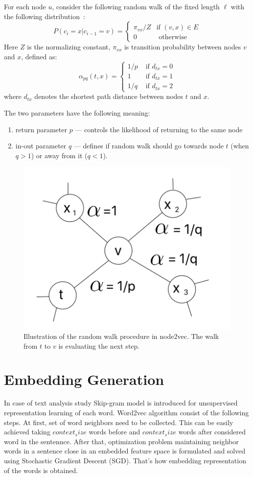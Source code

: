 For each node $u$, consider the following random walk of the fixed length $\ell$ with the following distribution~\cite{DBLP:journals/corr/abs-1011-4071}:
\begin{equation*}
P(c_i = x|c_{i-1} = v) =
 \begin{cases}
   \pi_{vx}/Z &\text{if $(v,x)\in E$}\\
   0 &\text{ otherwise}
 \end{cases}
\end{equation*}
Here $Z$ is the normalizing constant, $\pi_{vx}$ is transition probability between nodes $v$ and $x$, defined as: 
\[ 
  \alpha _{pq}(t, x) = \begin{cases}
   1/p &\text{ if $d_{tx} = 0$}\\
   1   &\text{ if $d_{tx} = 1$}\\
   1/q &\text{ if $d_{tx} = 2$}
   \end{cases}
\]
where $d_{tx}$ denotes the shortest path distance between nodes $t$ and $x$.


The two parameters have the following meaning:

\begin{enumerate}
    \item return parameter $p$ --- controls the likelihood of returning to the same node
    \item in-out parameter $q$ --- defines if random walk should go towards node $t$ (when $q > 1$) or away from it ($q < 1$).
\end{enumerate}

\begin{figure}[H]   \centering
    \includegraphics[width=0.5\linewidth]{plots/image2.png}
    \caption{Illustration   of   the   random   walk   procedure in node2vec. The walk from $t$ to $v$ is evaluating the next step.}
    \label{fig:my_label3}
\end{figure}

\section{Embedding Generation}
In case of text analysis study\cite{mikolov2013efficient} Skip-gram model is introduced for unsupervised representation learning of each word. Word2vec algorithm consist of the following steps. At first, set of word neighbors need to be collected. This can be easily achieved taking $context_size$ words before and $context_size$ words after considered word in the sentennce. After that, optimization problem maintaining neighbor words in a sentence close in an embedded feature space is formulated and solved using Stochastic Gradient Descent (SGD). That's how embedding representation of the words is obtained. 

